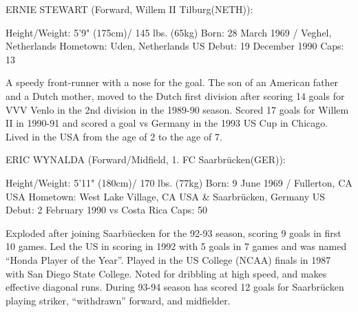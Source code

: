 ERNIE STEWART (Forward, Willem II Tilburg(NETH)):

Height/Weight: 5'9" (175cm)/ 145 lbs. (65kg)
Born: 28 March 1969 / Veghel, Netherlands
Hometown: Uden, Netherlands
US Debut: 19 December 1990
Caps: 13

A speedy front-runner with a nose for the goal. The son of an American father 
and a Dutch mother, moved to the Dutch first division after scoring 14 goals 
for VVV Venlo in the 2nd division in the 1989-90 season. Scored 17 goals for 
Willem II in 1990-91 and scored a goal vs Germany in the 1993 US Cup in 
Chicago. Lived in the USA from the age of 2 to the age of 7.


ERIC WYNALDA (Forward/Midfield, 1. FC Saarbr{\"u}cken(GER)):

Height/Weight: 5'11" (180cm)/ 170 lbs. (77kg)
Born: 9 June 1969 / Fullerton, CA USA
Hometown: West Lake Village, CA USA \& Saarbr{\"u}cken, Germany
US Debut: 2 February 1990 vs Costa Rica
Caps: 50

Exploded after joining Saarb{\"u}ecken for the 92-93 season, scoring 9 goals in 
first 10 games. Led the US in scoring in 1992 with 5 goals in 7 games and was 
named ``Honda Player of the Year''. Played in the US College (NCAA) finals in 
1987 with San Diego State College. Noted for dribbling at high speed, and makes
effective diagonal runs. During 93-94 season has scored 12 goals for
Saarbr{\"u}cken playing striker, ``withdrawn'' forward, and midfielder.
